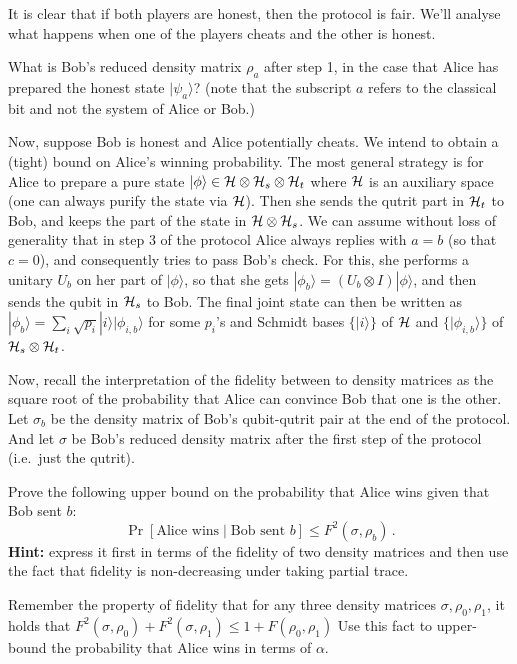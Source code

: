 \documentclass[a4paper,10pt,landscape,twocolumn]{scrartcl}
\newcommand{\ket}[1]{| #1 \rangle}
\begin{document}
\begin{exercise}
It is clear that if both players are honest, then the protocol is fair. We'll analyse what happens when one of the players cheats and the other is honest.

\begin{subex}
What is Bob's reduced density matrix $\rho_a$ after step 1, in the case that Alice has prepared the honest state $\ket{\psi_a}$? (note that the subscript $a$ refers to the classical bit and not the system of Alice or Bob.)
\end{subex}

\begin{subex}
Now, suppose Bob is honest and Alice potentially cheats. We intend to obtain a (tight) bound on Alice's winning probability. 
The most general strategy is for Alice to prepare a pure state $\ket{\phi} \in \Hi \otimes \Hi_s \otimes \Hi_t$ where $\mathcal{H}$ is an auxiliary space (one can always purify the state via $\mathcal{H}$). Then she sends the qutrit part in $\mathcal{H}_t$ to Bob, and keeps the part of the state in $\mathcal{H} \otimes \mathcal{H}_s$. 
We can assume without loss of generality that in step 3 of the protocol Alice always replies with $a=b$ (so that $c=0$), and consequently tries to pass Bob's check. For this, she performs a unitary $U_b$ on her part of $\ket{\phi}$, so that she gets $\ket{\phi_b}=(U_b \otimes I) \ket{\phi}$, and then sends the qubit in $\mathcal{H}_s$ to Bob. The final joint state can then be written as $\ket{\phi_b} = \sum_i \sqrt{p_i} \ket{i} \ket{\phi_{i,b}}$ for some $p_i$'s and Schmidt bases $\{ \ket{i} \}$ of $\mathcal{H}$ and $\{ \ket{\phi_{i,b}} \}$ of $\mathcal{H}_s \otimes \mathcal{H}_t$. 

Now, recall the interpretation of the fidelity between to density matrices as the square root of the probability that Alice can convince Bob that one is the other. Let $\sigma_b$ be the density matrix of Bob's qubit-qutrit pair at the end of the protocol. And let $\sigma$ be Bob's reduced density matrix after the first step of the protocol (i.e.\ just the qutrit).

Prove the following upper bound on the probability that Alice wins given that Bob sent $b$:
\[
\Pr[\text{Alice wins} \mid \text{Bob sent $b$}] \leq F^2(\sigma, \rho_b) \, .
\]
\textbf{Hint: }express it first in terms of the fidelity of two density matrices and then use the fact that fidelity is non-decreasing under taking partial trace.
\end{subex}

\begin{subex}
Remember the property of fidelity that for any three density matrices $\sigma, \rho_0, \rho_1$, it holds that $F^2(\sigma, \rho_0) + F^2(\sigma, \rho_1) \leq 1 + F(\rho_0, \rho_1)$
Use this fact to upper-bound the probability that Alice wins in terms of $\alpha$.
\end{subex}


\end{exercise}
\end{document}
